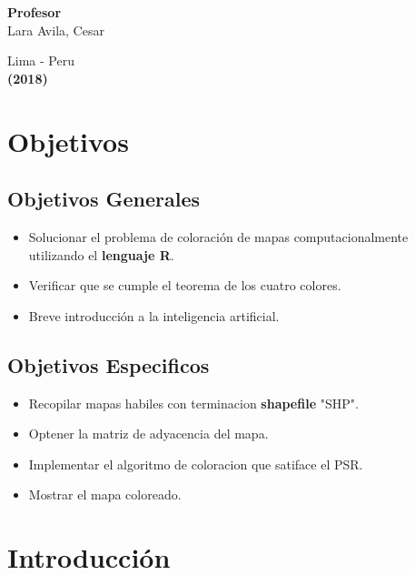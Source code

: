 \documentclass[a4paper]{article}
\begin{document}
\begin{titlepage}
\begin{center}
\vspace*{0.4in}
\begin{large}
{\bf Profesor} 
\vspace*{0.1in}
\\Lara Avila, Cesar
\end{large}

\end{center}
\begin{center}
\begin{large}
\vspace*{1.0in}
Lima - Peru\\
{\bf (2018)}
\end{large}
\end{center}
\end{titlepage}

\pagebreak
\tableofcontents
\pagebreak
\section{Objetivos}
\subsection{Objetivos Generales}
\begin{itemize}

\item Solucionar el problema de coloración de mapas computacionalmente utilizando el \textbf{lenguaje R}.
\item Verificar que se cumple el teorema de los cuatro colores.
\item Breve introducción a la inteligencia artificial.
\end{itemize}

\subsection{Objetivos Especificos}
\begin{itemize}
\item Recopilar mapas habiles con terminacion \textbf{shapefile} "SHP".
\item Optener la matriz de adyacencia del mapa.
\item Implementar el algoritmo de coloracion que satiface el PSR.
\item Mostrar el mapa coloreado.
\end{itemize}



\pagebreak
\section{Introducci\'on}
\end{document}
